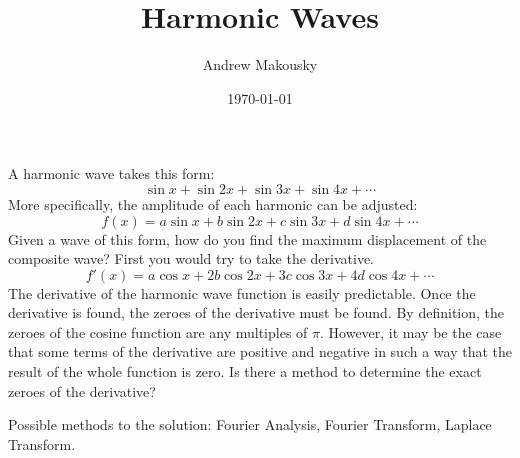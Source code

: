 \documentclass[11pt]{article}
\begin{document}
\title{Harmonic Waves}
\author{Andrew Makousky}
\date{\today}

\maketitle

A harmonic wave takes this form:
$$\sin{x} + \sin{2x} + \sin{3x} + \sin{4x} + \cdots$$
More specifically, the amplitude of each harmonic can be adjusted:
$$f(x) = a\sin{x} + b\sin{2x} + c\sin{3x} + d\sin{4x} + \cdots$$
Given a wave of this form, how do you find the maximum displacement of
the composite wave?  First you would try to take the derivative.
$$f'(x) = a\cos{x} + 2b\cos{2x} + 3c\cos{3x} + 4d\cos{4x} + \cdots$$
The derivative of the harmonic wave function is easily predictable.
Once the derivative is found, the zeroes of the derivative must be
found.  By definition, the zeroes of the cosine function are any
multiples of $\pi$.  However, it may be the case that some terms of
the derivative are positive and negative in such a way that the result
of the whole function is zero.  Is there a method to determine the
exact zeroes of the derivative?

Possible methods to the solution: Fourier Analysis, Fourier Transform,
Laplace Transform.
\end{document}
